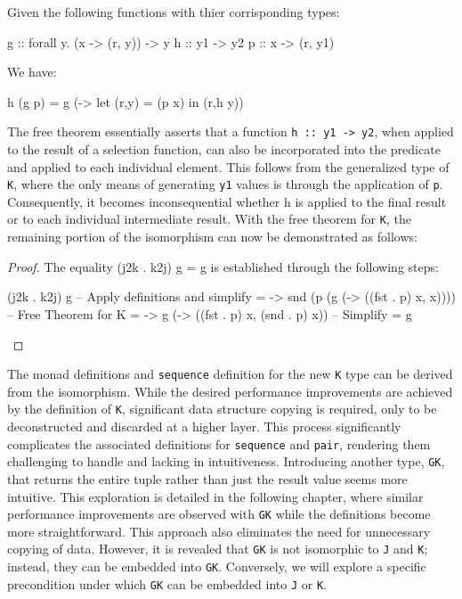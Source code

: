 \documentclass[runningheads]{llncs}
\begin{document}
\begin{theorem}
Given the following functions with thier corrisponding types:

\begin{haskell}
g :: forall y. (x -> (r, y)) -> y
h :: y1 -> y2
p :: x -> (r, y1)
\end{haskell}

We have:

\begin{haskell}
h (g p) = g (\x -> let (r,y) = (p x) in (r,h y))
\end{haskell}

\end{theorem}

The free theorem essentially asserts that a function
\texttt{h\ ::\ y1\ -\textgreater{}\ y2}, when applied to the result of a
selection function, can also be incorporated into the predicate and
applied to each individual element. This follows from the generalized
type of \texttt{K}, where the only means of generating \texttt{y1}
values is through the application of \texttt{p}. Consequently, it
becomes inconsequential whether h is applied to the final result or to
each individual intermediate result. With the free theorem for
\texttt{K}, the remaining portion of the isomorphism can now be
demonstrated as follows:

\begin{proof}
The equality (j2k . k2j) g = g is established through the following steps:

\begin{haskell}
(j2k . k2j) g
-- {{ Apply definitions and simplify}}
= \p -> snd (p (g (\x -> ((fst . p) x, x))))
-- {{ Free Theorem for K }}
= \p -> g (\x -> ((fst . p) x, (snd . p) x))
-- {{ Simplify }}
= g
\end{haskell}

\end{proof}

The monad definitions and \texttt{sequence} definition for the new
\texttt{K} type can be derived from the isomorphism. While the desired
performance improvements are achieved by the definition of \texttt{K},
significant data structure copying is required, only to be deconstructed
and discarded at a higher layer. This process significantly complicates
the associated definitions for \texttt{sequence} and \texttt{pair},
rendering them challenging to handle and lacking in intuitiveness.
Introducing another type, \texttt{GK}, that returns the entire tuple
rather than just the result value seems more intuitive. This exploration
is detailed in the following chapter, where similar performance
improvements are observed with \texttt{GK} while the definitions become
more straightforward. This approach also eliminates the need for
unnecessary copying of data. However, it is revealed that \texttt{GK} is
not isomorphic to \texttt{J} and \texttt{K}; instead, they can be
embedded into \texttt{GK}. Conversely, we will explore a specific
precondition under which \texttt{GK} can be embedded into \texttt{J} or
\texttt{K}.
\end{document}
